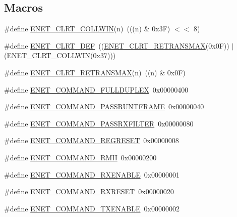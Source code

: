 \subsection*{Macros}
\begin{DoxyCompactItemize}
\item 
\#define \hyperlink{group__ENET__17XX__40XX_ga541a85ac1f97834806ea7bd907ca7ef5}{E\+N\+E\+T\+\_\+\+C\+L\+R\+T\+\_\+\+C\+O\+L\+L\+W\+IN}(n)~(((n) \& 0x3\+F) $<$$<$ 8)
\item 
\#define \hyperlink{group__ENET__17XX__40XX_ga3840d22e13373045c63bc14bb36800a6}{E\+N\+E\+T\+\_\+\+C\+L\+R\+T\+\_\+\+D\+EF}~((\hyperlink{group__ENET__17XX__40XX_ga2e261dd603d1a1909d1b00e11634a958}{E\+N\+E\+T\+\_\+\+C\+L\+R\+T\+\_\+\+R\+E\+T\+R\+A\+N\+S\+M\+AX}(0x0\+F)) $\vert$ (\+E\+N\+E\+T\+\_\+\+C\+L\+R\+T\+\_\+\+C\+O\+L\+L\+W\+I\+N(0x37)))
\item 
\#define \hyperlink{group__ENET__17XX__40XX_ga2e261dd603d1a1909d1b00e11634a958}{E\+N\+E\+T\+\_\+\+C\+L\+R\+T\+\_\+\+R\+E\+T\+R\+A\+N\+S\+M\+AX}(n)~((n) \& 0x0\+F)
\item 
\#define \hyperlink{group__ENET__17XX__40XX_gac5380c0bb8853772b22db6b37b2c812e}{E\+N\+E\+T\+\_\+\+C\+O\+M\+M\+A\+N\+D\+\_\+\+F\+U\+L\+L\+D\+U\+P\+L\+EX}~0x00000400
\item 
\#define \hyperlink{group__ENET__17XX__40XX_ga22c8103c39e17d184acb4956428022c8}{E\+N\+E\+T\+\_\+\+C\+O\+M\+M\+A\+N\+D\+\_\+\+P\+A\+S\+S\+R\+U\+N\+T\+F\+R\+A\+ME}~0x00000040
\item 
\#define \hyperlink{group__ENET__17XX__40XX_gad15a361a9ea2dae055b13d1416dde2df}{E\+N\+E\+T\+\_\+\+C\+O\+M\+M\+A\+N\+D\+\_\+\+P\+A\+S\+S\+R\+X\+F\+I\+L\+T\+ER}~0x00000080
\item 
\#define \hyperlink{group__ENET__17XX__40XX_ga6745bb544166e94ec0ec4635ce85c2a2}{E\+N\+E\+T\+\_\+\+C\+O\+M\+M\+A\+N\+D\+\_\+\+R\+E\+G\+R\+E\+S\+ET}~0x00000008
\item 
\#define \hyperlink{group__ENET__17XX__40XX_ga933d30adf6557d69ddcd1bd0ff3dd3b5}{E\+N\+E\+T\+\_\+\+C\+O\+M\+M\+A\+N\+D\+\_\+\+R\+M\+II}~0x00000200
\item 
\#define \hyperlink{group__ENET__17XX__40XX_ga9cbb8fee3c8f649b53585358bd4b78a1}{E\+N\+E\+T\+\_\+\+C\+O\+M\+M\+A\+N\+D\+\_\+\+R\+X\+E\+N\+A\+B\+LE}~0x00000001
\item 
\#define \hyperlink{group__ENET__17XX__40XX_gabcbc994bca6d1eb4b677e8f8c58e3ef9}{E\+N\+E\+T\+\_\+\+C\+O\+M\+M\+A\+N\+D\+\_\+\+R\+X\+R\+E\+S\+ET}~0x00000020
\item 
\#define \hyperlink{group__ENET__17XX__40XX_gaad9ec2211ed810f3b3c37156c152a307}{E\+N\+E\+T\+\_\+\+C\+O\+M\+M\+A\+N\+D\+\_\+\+T\+X\+E\+N\+A\+B\+LE}~0x00000002
$$
\end{DoxyCompactItemize}
